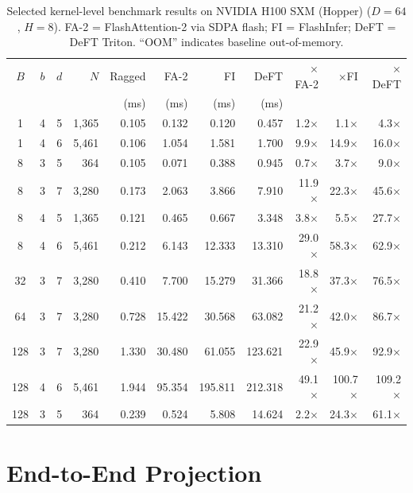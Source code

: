 \documentclass{article}
\newcommand{\numtokens}{N}
\newcommand{\depth}{d}
\newcommand{\branching}{b}
\newcommand{\headdim}{D}
\newcommand{\nheads}{H}
\newcommand{\batchsize}{B}
\begin{document}
\begin{table}[t]
\centering
\caption{%
  Selected kernel-level benchmark results on NVIDIA H100 SXM (Hopper)
  ($\headdim = 64$, $\nheads = 8$).
  FA-2 = FlashAttention-2 via SDPA flash; FI = FlashInfer; DeFT = DeFT Triton.
  ``OOM'' indicates baseline out-of-memory.
}
\label{tab:results}
\small
\begin{tabular}{cccr rrrr rrr}
\toprule
$\batchsize$ & $\branching$ & $\depth$ & $\numtokens$
  & Ragged & FA-2 & FI & DeFT
  & $\times$FA-2 & $\times$FI & $\times$DeFT \\
  & & & & (ms) & (ms) & (ms) & (ms) & & & \\
\midrule
1  & 4 & 5 & 1{,}365   & 0.105 & 0.132  & 0.120  & 0.457  & 1.2$\times$ & 1.1$\times$ & 4.3$\times$ \\
1  & 4 & 6 & 5{,}461   & 0.106 & 1.054  & 1.581  & 1.700  & 9.9$\times$ & 14.9$\times$ & 16.0$\times$ \\
8  & 3 & 5 & 364       & 0.105 & 0.071  & 0.388  & 0.945  & 0.7$\times$ & 3.7$\times$ & 9.0$\times$ \\
8  & 3 & 7 & 3{,}280   & 0.173 & 2.063  & 3.866  & 7.910  & 11.9$\times$ & 22.3$\times$ & 45.6$\times$ \\
8  & 4 & 5 & 1{,}365   & 0.121 & 0.465  & 0.667  & 3.348  & 3.8$\times$ & 5.5$\times$ & 27.7$\times$ \\
8  & 4 & 6 & 5{,}461   & 0.212 & 6.143  & 12.333 & 13.310 & 29.0$\times$ & 58.3$\times$ & 62.9$\times$ \\
32 & 3 & 7 & 3{,}280   & 0.410 & 7.700  & 15.279 & 31.366 & 18.8$\times$ & 37.3$\times$ & 76.5$\times$ \\
64 & 3 & 7 & 3{,}280   & 0.728 & 15.422 & 30.568 & 63.082 & 21.2$\times$ & 42.0$\times$ & 86.7$\times$ \\
128& 3 & 7 & 3{,}280   & 1.330 & 30.480 & 61.055 & 123.621& 22.9$\times$ & 45.9$\times$ & 92.9$\times$ \\
128& 4 & 6 & 5{,}461   & 1.944 & 95.354 & 195.811& 212.318& 49.1$\times$ & 100.7$\times$& 109.2$\times$\\
128& 3 & 5 & 364       & 0.239 & 0.524  & 5.808  & 14.624 & 2.2$\times$ & 24.3$\times$ & 61.1$\times$ \\
\bottomrule
\end{tabular}
\end{table}

\section{End-to-End Projection}\label{sec:e2e}
\end{document}
